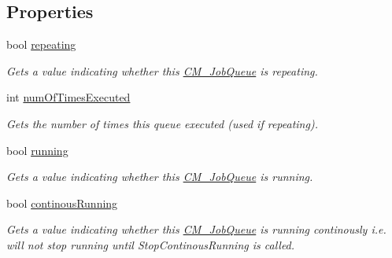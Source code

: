 \subsection*{Properties}
\begin{DoxyCompactItemize}
\item 
bool \hyperlink{class_c_m___job_queue_a652f13e97ccd6cd66fe899e0d4612842}{repeating}
\begin{DoxyCompactList}\small\item\em Gets a value indicating whether this \hyperlink{class_c_m___job_queue}{C\+M\+\_\+\+Job\+Queue} is repeating. \end{DoxyCompactList}\item 
int \hyperlink{class_c_m___job_queue_a09c449c39674203848e7d939e3742460}{num\+Of\+Times\+Executed}
\begin{DoxyCompactList}\small\item\em Gets the number of times this queue executed (used if repeating). \end{DoxyCompactList}\item 
bool \hyperlink{class_c_m___job_queue_aa7e3982beb8c64bf115c0adc30134d84}{running}
\begin{DoxyCompactList}\small\item\em Gets a value indicating whether this \hyperlink{class_c_m___job_queue}{C\+M\+\_\+\+Job\+Queue} is running. \end{DoxyCompactList}\item 
bool \hyperlink{class_c_m___job_queue_a93ffe57018263669329b70e523ac8fa1}{continous\+Running}
\begin{DoxyCompactList}\small\item\em Gets a value indicating whether this \hyperlink{class_c_m___job_queue}{C\+M\+\_\+\+Job\+Queue} is running continously i.\+e. will not stop running until Stop\+Continous\+Running is called. \end{DoxyCompactList}\end{DoxyCompactItemize}
